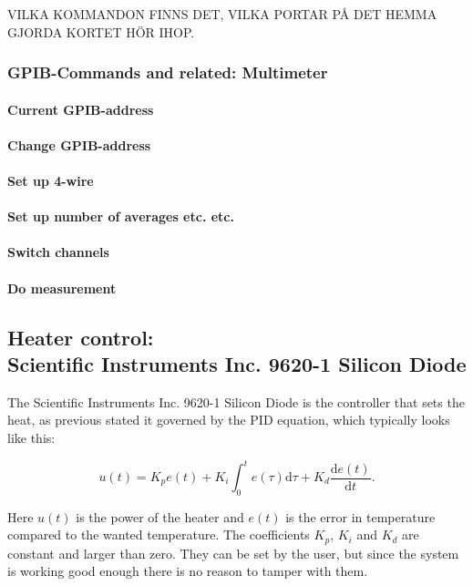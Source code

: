 \documentclass[a4paper,12pt]{article}
\begin{document}
VILKA KOMMANDON FINNS DET, VILKA PORTAR PÅ DET HEMMA GJORDA KORTET HÖR IHOP.

\subsubsection{GPIB-Commands and related: Multimeter}

\paragraph{Current GPIB-address}

\paragraph{Change GPIB-address}

\paragraph{Set up 4-wire}

\paragraph{Set up number of averages etc. etc.}

\paragraph{Switch channels}

\paragraph{Do measurement}


\subsection{Heater control: \\ Scientific Instruments Inc. 9620-1 Silicon Diode}
The Scientific Instruments Inc. 9620-1 Silicon Diode is the controller that sets the heat, as previous stated it governed by the PID equation, which typically looks like this:

\begin{equation}
u(t)= K_pe(t) + K_i\int_0^t \! e(\tau)\mathrm{d}\tau + K_d\frac{\mathrm{d}e(t)}{\mathrm{d}t}.
\label{eq:PID}
\end{equation}

\noindent Here $u(t)$ is the power of the heater and $e(t)$ is the error in temperature compared to the wanted temperature. The coefficients $K_p$, $K_i$ and $K_d$ are constant and larger than zero. They can be set by the user, but since the system is working good enough there is no reason to tamper with them. 
\end{document}
